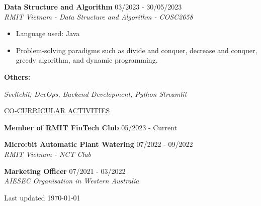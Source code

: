 \documentclass[11pt]{article}
\newcommand{\betteruline}[1]{
    \uline{#1}
}
\newcommand{\sectiontitle}[1]{
    \begingroup
        \titlebold
        \betteruline{\Large\uppercase{#1}  }
        \vspace{1.7mm}
    \endgroup
}
\newcommand{\sectioncontent}[1]{
    \begingroup
        \begin{FlushLeft}
        \vspace{-3mm}
        \sffamily\small#1
        \end{FlushLeft}
    \endgroup
    \vspace{2mm}
}
\newcommand{\project}[2]{
    \begingroup
        \textbf{\small#1}
        \hfill\color{black!70}\small{#2}
    \endgroup
}
\newcommand{\spacevv}{
    \vspace{2mm}
}
\begin{document}
\begin{paracol}{2}
{       \project{Data Structure and Algorithm}{03/2023 - 30/05/2023} \\
    \vspace{1mm}
        \textcolor{black!70}{\textit{RMIT Vietnam - Data Structure and Algorithm - COSC2658}}
        \vspace{1mm}
        \begin{itemize}
            \item Language used: Java
            \vspace{1mm} 
            \item Problem-solving paradigms such as divide and conquer, decrease and conquer, greedy algorithm, and dynamic programming.
            \vspace{1mm} 
        \end{itemize}
        \spacevv

        \project{Others:}{}
    \vspace{1mm}
        {\textit{Sveltekit, DevOps, Backend Development, Python Streamlit}}
        \spacevv
        
    }

    \sectiontitle{CO-CURRICULAR ACTIVITIES}
    \sectioncontent{
    \vspace{1mm}

        \project{Member of RMIT FinTech Club}{05/2023 - Current} \\
            \vspace{1mm} 
          \spacevv
        
        \project{Micro:bit Automatic Plant Watering}{07/2022 - 09/2022} \\
            \textcolor{black!70}{\textit{RMIT Vietnam - NCT Club}}
            \vspace{1mm} 
            \spacevv

        \project{Marketing Officer}{07/2021 - 03/2022} \\
            \textcolor{black!70}{\textit{AIESEC Organisation in Western Australia}}
            \vspace{1mm} 
            \spacevv
    
    }

    \normaltext \hfill \tiny Last updated \today

    \end{paracol}
\end{document}
